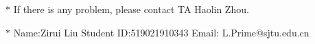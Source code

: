 \documentclass[12pt,a4paper]{article}
\theoremstyle{definition}
\begin{document}
	\noindent
	
	\noindent{}
	\begin{center}
		\footnotesize{\color{red}$*$ If there is any problem, please contact TA Haolin Zhou.}
		
		\footnotesize{\color{blue}$*$ Name:Zirui Liu  \quad Student ID:519021910343 \quad Email: L.Prime@sjtu.edu.cn}
		
	\end{center}
	
\end{document}
